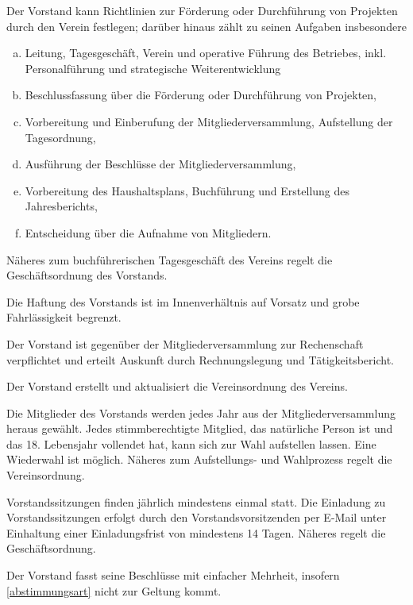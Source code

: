 \begin{contract}
    Der Vorstand kann Richtlinien zur Förderung oder Durchführung von Projekten durch den Verein festlegen; darüber hinaus zählt zu seinen Aufgaben insbesondere
    \begin{enumerate}[(a)]
        \item Leitung, Tagesgeschäft, Verein und operative Führung des Betriebes, inkl. Personalführung und strategische Weiterentwicklung
        \item Beschlussfassung über die Förderung oder Durchführung von Projekten,
        \item Vorbereitung und Einberufung der Mitgliederversammlung, Aufstellung der Tagesordnung,
        \item Ausführung der Beschlüsse der Mitgliederversammlung,
        \item Vorbereitung des Haushaltsplans, Buchführung und Erstellung des Jahresberichts,
        \item Entscheidung über die Aufnahme von Mitgliedern.
    \end{enumerate}
    Näheres zum buchführerischen Tagesgeschäft des Vereins regelt die Geschäftsordnung des Vorstands.

    Die Haftung des Vorstands ist im Innenverhältnis auf Vorsatz und grobe Fahrlässigkeit begrenzt.

    Der Vorstand ist gegenüber der Mitgliederversammlung zur Rechenschaft verpflichtet und erteilt Auskunft durch Rechnungslegung und Tätigkeitsbericht.

    Der Vorstand erstellt und aktualisiert die Vereinsordnung des Vereins.


    Die Mitglieder des Vorstands werden jedes Jahr aus der Mitgliederversammlung heraus
    gewählt. Jedes stimmberechtigte Mitglied, das natürliche Person ist und das 18. Lebensjahr
    vollendet hat, kann sich zur Wahl aufstellen lassen. Eine Wiederwahl ist möglich. Näheres zum Aufstellungs- und Wahlprozess regelt die Vereinsordnung.

    Vorstandssitzungen finden jährlich mindestens einmal statt. Die Einladung zu Vorstandssitzungen erfolgt durch den Vorstandsvorsitzenden per E-Mail unter Einhaltung einer Einladungsfrist von mindestens 14 Tagen. Näheres regelt die Geschäftsordnung.

    Der Vorstand fasst seine Beschlüsse mit einfacher Mehrheit, insofern \ref{abstimmungsart} nicht zur Geltung kommt.


\end{contract}

